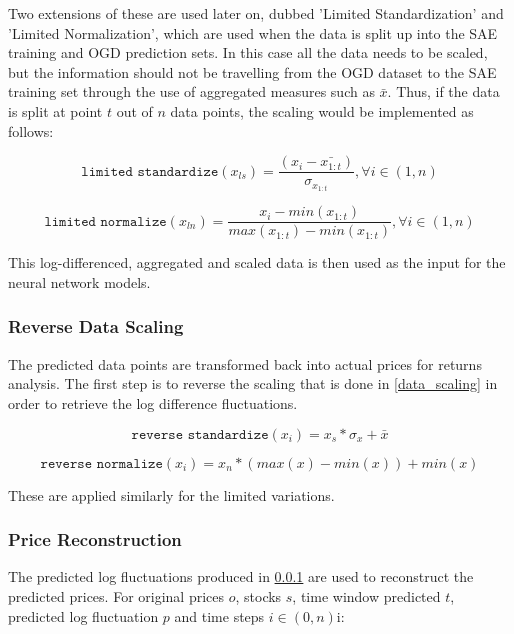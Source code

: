 \documentclass[a4paper,latin]{paper}
\begin{document}
Two extensions of these are used later on, dubbed 'Limited Standardization' and 'Limited Normalization', which are used when the data is split up into the SAE training and OGD prediction sets. In this case all the data needs to be scaled, but the information should not be travelling from the OGD dataset to the SAE training set through the use of aggregated measures such as $\bar{x}$. Thus, if the data is split at point $t$ out of $n$ data points, the scaling would be implemented as follows:

\begin{equation}
\texttt{limited standardize} (x_{ls}) = \frac{(x_i - \bar{x_{1:t}}) }{\sigma_{x_{1:t}}} , \forall  i \in (1, n)
\end{equation}

\begin{equation}
\texttt{limited normalize} (x_{ln}) = \frac{x_i - min(x_{1:t}) }{max(x_{1:t}) - min(x_{1:t})} , \forall  i \in (1, n)
\end{equation}


This log-differenced, aggregated and scaled data is then used as the input for the neural network models.

\subsubsection{Reverse Data Scaling}\label{data_reverse_scaling}

The predicted data points are transformed back into actual prices for returns analysis. The first step is to reverse the scaling that is done in \ref{data_scaling} in order to retrieve the log difference fluctuations.

\begin{equation}
\texttt{reverse standardize}(x_i) = x_s * \sigma_x + \bar{x}
\end{equation}

\begin{equation}
\texttt{reverse normalize}(x_i) = x_n * (max(x) - min(x)) + min(x)
\end{equation}

These are applied similarly for the limited variations.

\subsubsection{Price Reconstruction}\label{data_price_recon}

The predicted log fluctuations produced in \ref{data_reverse_scaling} are used to reconstruct the predicted prices. For original prices $o$, stocks $s$, time window predicted $t$, predicted log fluctuation $p$ and time steps $i \in (0, n)$i:
\end{document}
